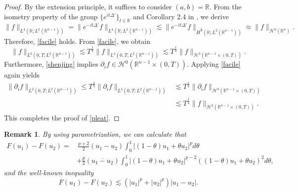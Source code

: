 \documentclass[preprint,compress,12pt]{elsarticle}
\newtheorem{remark}[theorem]{Remark}
\numberwithin{equation}{section}
\begin{document}
\begin{proof}
	 By the extension principle, it suffices to consider  $(a,b)=\mathbb{R}$. From the isometry property of the group $\{e^{it\Delta'}\}_{t\in\mathbb{R}}$ and Corollary 2.4 in \cite{facilitate}, we derive
		\begin{equation*} \|f\|_{L^{4}(\mathbb{R};L^{2}(\mathbb{R}^{n-1}))}=\|e^{-it\Delta'}f\|_{L^{4}(\mathbb{R};L^{2}(\mathbb{R}^{n-1}))}\lesssim\|e^{-it\Delta'}f\|_{\dot{H}^{\frac{1}{4}}(\mathbb{R};L^{2}(\mathbb{R}^{n-1}))}\approx\|f\|_{\mathcal{H}^{0}(\mathbb{R}^{n})}.
		\end{equation*}
		Therefore, \eqref{facile} holds. From \eqref{facile}, we obtain
		\begin{equation*}
			\|f\|_{L^{2}(0,T;L^{2}(\mathbb{R}^{n-1}))}\lesssim T^{\frac{1}{4}}\|f\|_{L^{4}(0,T;L^{2}(\mathbb{R}^{n-1}))} \lesssim  T^{\frac{1}{4}}\|f\|_{\mathcal{H}^{2}(\mathbb{R}^{n-1}\times(0,T))}.
		\end{equation*}
		Furthermore, \eqref{shenjing}  implies $\partial_{i}f\in\mathcal{H}^{0}(\mathbb{R}^{n-1}\times(0,T))$. Applying \eqref{facile} again yields
		\begin{equation*}
			\begin{aligned}
				\|\partial_{i}f\|_{L^{2}(0,T;L^{2}(\mathbb{R}^{n-1}))}\leq T^{\frac{1}{4}}	\|\partial_{i}f\|_{L^{4}(0,T;L^{2}(\mathbb{R}^{n-1}))}&\lesssim T^{\frac{1}{4}}\|\partial_{i}f\|_{\mathcal{H}^{0}(\mathbb{R}^{n-1}\times(0,T))}\\&\lesssim T^{\frac{1}{4}}\|f\|_{\mathcal{H}^{2}(\mathbb{R}^{n-1}\times(0,T))}.
			\end{aligned}
		\end{equation*}
		This completes the proof of \eqref{pleat}.
\end{proof}
\begin{remark}
	By using parametrization, we can calculate that
	\begin{equation}\label{slate}
		\begin{aligned} F(u_{1})-F(u_{2})=&\,\frac{p+2}{2}(u_{1}-u_{2})\int_{0}^{1}\left|(1-\theta)u_{1}+\theta u_{2}\right|^{p}d\theta \\
			&+\frac{p}{2}(\overline{u_{1}-u_{2}})\int_{0}^{1} |(1-\theta)u_{1}+\theta u_{2}|^{p-2}\left((1-\theta)u_{1}+\theta u_{2}\right)^{2}d\theta,
		\end{aligned}
	\end{equation}
	and the well-known inequality
	\begin{equation}\label{uproar}
		F(u_{1})-F(u_{2})\lesssim \left(|u_{1}|^{p}+|u_{2}|^{p}\right)|u_{1}-u_{2}|.
	\end{equation}
\end{remark}
\end{document}
